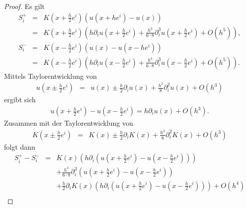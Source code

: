 \begin{proof}
    Es gilt
    \begin{eqnarray*}
            S^+_i
        &=& K\left(x + \frac{h}{2} e^i\right) \left(u\left(x + h e^i\right)
            - u(x)\right) \\
        &=& K\left(x + \frac{h}{2} e^i\right) \left(h\partial_i
            u\left(x + \frac{h}{2} e^i\right)
            + \frac{h^3}{6 \cdot 8}\partial_i^3
            u\left(x + \frac{h}{2} e^i\right) + O(h^5)\right),
        \\
            S^-_i
        &=& K\left(x - \frac{h}{2} e^i\right) \left(u(x)
            - u\left(x - h e^i\right)\right) \\
        &=& K\left(x - \frac{h}{2} e^i\right) \left(h\partial_i
            u\left(x - \frac{h}{2} e^i\right)
            + \frac{h^3}{6 \cdot 8}\partial_i^3
            u\left(x - \frac{h}{2} e^i\right) + O(h^5)\right).
    \end{eqnarray*}
    Mittels Taylorentwicklung von
    \begin{eqnarray*}
            u\left(x \pm \frac{h}{2}e^i\right)
        &=& u(x) \pm \frac{h}{2}\partial_i u(x)
            + \frac{h^2}{8}\partial_i^2 u(x) + O(h^3)
    \end{eqnarray*}
    ergibt sich
    \begin{eqnarray*}
        u\left(x + \frac{h}{2} e^i\right) - u\left(x - \frac{h}{2} e^i\right)
        = h \partial_i u(x) + O(h^3).
    \end{eqnarray*}
    Zusammen mit der Taylorentwicklung von
    \begin{eqnarray*}
            K\left(x \pm \frac{h}{2}e^i\right)
        &=& K(x) \pm \frac{h}{2}\partial_i K(x)
            + \frac{h^2}{8}\partial_i^2 K(x) + O(h^3)
    \end{eqnarray*}
    folgt dann
    \begin{eqnarray*}
            S^+_i - S^-_i
        &=& K(x) \left(h\partial_i \left(u\left(x + \frac{h}{2} e^i\right)
            - u\left(x - \frac{h}{2} e^i\right)\right)\right) \\
        &&  + \frac{h^3}{6 \cdot 8}\partial_i^3
            \left(u\left(x + \frac{h}{2} e^i\right)
            - u\left(x - \frac{h}{2} e^i\right)\right) \\
        &&    + \frac{h}{2}\partial_i K(x)
            \left(h\partial_i \left(u\left(x + \frac{h}{2} e^i\right)
            - u\left(x - \frac{h}{2} e^i\right)\right)\right)
            + O(h^4) \\

\end{eqnarray*}
\end{proof}

